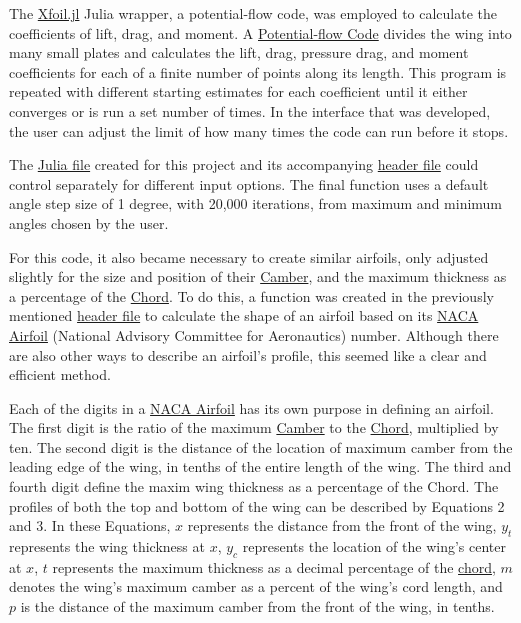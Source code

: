 \documentclass{article}
\begin{document}
The \href{https://docs.juliahub.com/Xfoil/Mlbda/0.4.0/}{Xfoil.jl} Julia wrapper, a potential-flow code, was employed to calculate the coefficients of lift, drag, and moment. A \hyperlink{PFC}{Potential-flow Code} divides the wing into many small plates and calculates the lift, drag, pressure drag, and moment coefficients for each of a finite number of points along its length. This program is repeated with different starting estimates for each coefficient until it either converges or is run a set number of times. In the interface that was developed, the user can adjust the limit of how many times the code can run before it stops.\newline

The \href{https://github.com/JoeSpencer1/497R-Projects/blob/Airfoil-Analysis/Airfoil_Analysis.jl}{Julia file} created for this project and its accompanying \href{https://github.com/JoeSpencer1/497R-Projects/blob/Airfoil-Analysis/Airfoil_Functions.jl}{header file} could control separately for different input options. The final function uses a default angle step size of 1 degree, with 20,000 iterations, from maximum and minimum angles chosen by the user.\newline

For this code, it also became necessary to create similar airfoils, only adjusted slightly for the size and position of their \hyperlink{Camber}{Camber}, and the maximum thickness as a percentage of the \hyperlink{c}{Chord}. To do this, a function was created in the previously mentioned \href{https://github.com/JoeSpencer1/497R-Projects/blob/Airfoil-Analysis/Airfoil_Functions.jl}{header file} to calculate the shape of an airfoil based on its \hyperlink{NACA}{NACA Airfoil} (National Advisory Committee for Aeronautics) number. Although there are also other ways to describe an airfoil's profile, this seemed like a clear and efficient method.\newline

Each of the digits in a \hyperlink{NACA}{NACA Airfoil} has its own purpose in defining an airfoil. The first digit is the ratio of the maximum \hyperlink{Camber}{Camber} to the \hyperlink{c}{Chord}, multiplied by ten. The second digit is the distance of the location of maximum camber from the leading edge of the wing, in tenths of the entire length of the wing. The third and fourth digit define the maxim wing thickness as a percentage of the Chord. The profiles of both the top and bottom of the wing can be described by Equations 2 and 3. In these Equations, $x$ represents the distance from the front of the wing, $y_{t}$ represents the wing thickness at $x$, $y_{c}$ represents the location of the wing's center at $x$, $t$ represents the maximum thickness as a decimal percentage of the \hyperlink{c}{chord}, $m$ denotes the wing's maximum camber as a percent of the wing's cord length, and $p$ is the distance of the maximum camber from the front of the wing, in tenths.
\end{document}

